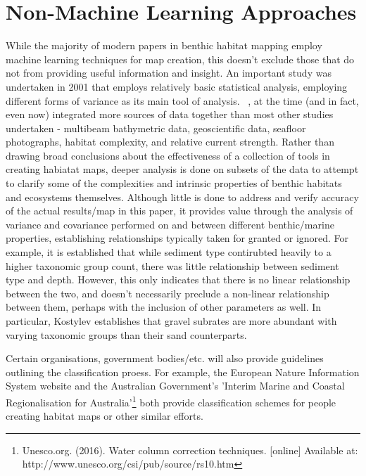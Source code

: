             \section{Non-Machine Learning Approaches} 
            While the majority of modern papers in benthic habitat mapping employ machine learning techniques for map creation, this doesn't exclude those that do not from providing useful information and insight. An important study was undertaken in 2001 that employs relatively basic statistical analysis, employing different forms of variance as its main tool of analysis. ~\citep{kostylev01}, at the time (and in fact, even now) integrated more sources of data together than most other studies undertaken - multibeam bathymetric data, geoscientific data, seafloor photographs, habitat complexity, and relative current strength. Rather than drawing broad conclusions about the effectiveness of a collection of tools in creating habiatat maps, deeper analysis is done on subsets of the data to attempt to clarify some of the complexities and intrinsic properties of benthic habitats and ecosystems themselves. Although little is done to address and verify accuracy of the actual results/map in this paper, it provides value through the analysis of variance and covariance performed on and between different benthic/marine properties, establishing relationships typically taken for granted or ignored. For example, it is established that while sediment type contirubted heavily to a higher taxonomic group count, there was little relationship between sediment type and depth. However, this only indicates that there is no linear relationship between the two, and doesn't necessarily preclude a non-linear relationship between them, perhaps with the inclusion of other parameters as well. In particular, Kostylev establishes that gravel subrates are more abundant with varying taxonomic groups than their sand counterparts.

            \pagebreak
            Certain organisations, government bodies/etc. will also provide guidelines outlining the classification proess. For example, the European Nature Information System website and the Australian Government's 'Interim Marine and Coastal Regionalisation for Australia'\footnote{Unesco.org. (2016). Water column correction techniques. [online] Available at: http://www.unesco.org/csi/pub/source/rs10.htm} both provide classification schemes for people creating habitat maps or other similar efforts.

